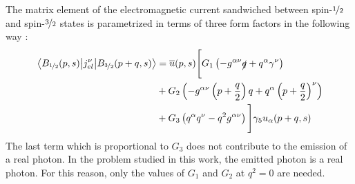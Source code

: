 The matrix element of the  electromagnetic current sandwiched between spin-$\nicefrac{1}{2}$ and spin-$\nicefrac{3}{2}$ states is parametrized in terms of three form factors in the following way \cite{JONESmatrixel,KORNERmatrixel}:
\begin{equation}
    \begin{aligned}
        \mel{B_{\nicefrac{1}{2}}(p,s)}{j_{el}^\nu}{B_{\nicefrac{3}{2}}(p+q,s)} &=\overline{u}(p,s)\Bigg[G_1\left(-g^{\alpha\nu}\slashed{q}+q^{\alpha}\gamma^{\nu}\right)\\
        &+G_2\left(-g^{\alpha\nu}\left(p+\dfrac{q}{2}\right)q + q^\alpha\left(p+\dfrac{q}{2}\right)^\nu\right)\\
        &+G_3\left(q^\alpha q^\nu - q^2g^{\alpha\nu}\right)\Bigg]\gamma_5 u_\alpha(p+q,s)
    \end{aligned}
    \label{el_mel}
\end{equation}
The last term which is proportional to $ G_3$ does not contribute to the emission of a real photon. In the problem studied in this work, the emitted photon is a real photon. For this reason, only the values of $G_1$ and $G_2$ at $q^2=0$ are needed.

